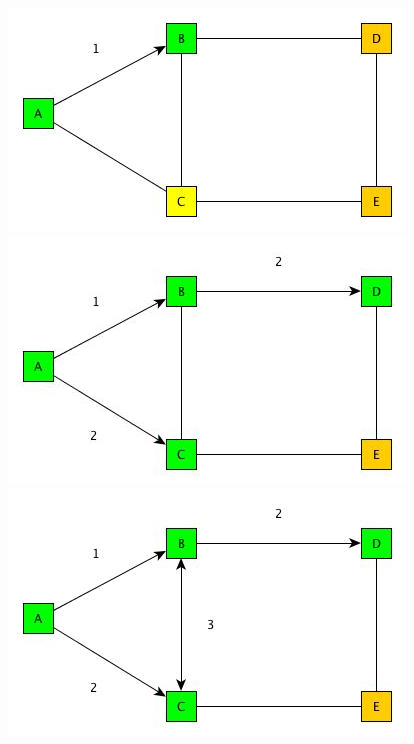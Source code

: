 \documentclass[11pt,a4paper]{article}
\begin{document}
\begin{figure}[!h]
   \begin{minipage}[t]{0.45\textwidth}
      \vspace{0pt}
      \includegraphics[width=\linewidth]{figures/network_gossip_1.jpg}
   \end{minipage}
   \hfill
   \begin{minipage}[t]{0.45\textwidth}
      \vspace{0pt}
      \includegraphics[width=\linewidth]{figures/network_gossip_2.jpg}
   \end{minipage}
   \vspace{5ex}
     \begin{center}
     \begin{minipage}[c]{0.45\textwidth}
      \vspace{0pt}
      \includegraphics[width=\linewidth]{figures/network_gossip_3.jpg}
   	\end{minipage}
   \end{center}
   

\end{figure}
\end{document}
